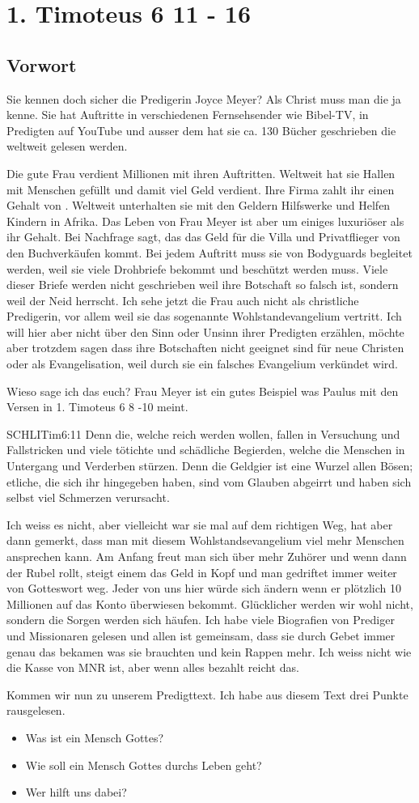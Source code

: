 \section{1. Timoteus 6 11 - 16}

\subsection{Vorwort}
Sie kennen doch sicher die Predigerin Joyce Meyer? Als Christ muss man die ja kenne. Sie hat Auftritte in verschiedenen Fernsehsender wie Bibel-TV, in Predigten auf YouTube und ausser dem hat sie ca. 130 Bücher geschrieben die weltweit gelesen werden.

Die gute Frau verdient Millionen mit ihren Auftritten. Weltweit hat sie Hallen mit Menschen gefüllt und damit viel Geld verdient. Ihre Firma zahlt ihr einen Gehalt von . Weltweit unterhalten sie mit den Geldern Hilfswerke und Helfen Kindern in Afrika. Das Leben von Frau Meyer ist aber um einiges luxuriöser als ihr Gehalt. Bei Nachfrage sagt, das das Geld für die Villa und Privatflieger von den Buchverkäufen kommt. Bei jedem Auftritt muss sie von Bodyguards begleitet werden, weil sie viele Drohbriefe bekommt und beschützt werden muss. Viele dieser Briefe werden nicht geschrieben weil ihre Botschaft so falsch ist, sondern weil der Neid herrscht. Ich sehe jetzt die Frau auch nicht als christliche Predigerin, vor allem weil sie das sogenannte Wohlstandevangelium vertritt. Ich will hier aber nicht über den Sinn oder Unsinn ihrer Predigten erzählen, möchte aber trotzdem sagen dass ihre Botschaften nicht geeignet sind für neue Christen oder als Evangelisation, weil durch sie ein falsches Evangelium verkündet wird.

Wieso sage ich das euch? Frau Meyer ist ein gutes Beispiel was Paulus mit den Versen in 1. Timoteus 6 8 -10 meint.
\begin{bibelbox}{SCHL}{ITim}{6:11}
Denn die, welche reich werden wollen, fallen in Versuchung und Fallstricken und viele tötichte und schädliche Begierden, welche die Menschen in Untergang und Verderben stürzen. Denn die Geldgier ist eine Wurzel allen Bösen; etliche, die sich ihr hingegeben haben, sind vom Glauben abgeirrt und haben sich selbst viel Schmerzen verursacht.
\end{bibelbox}
Ich weiss es nicht, aber vielleicht war sie mal auf dem richtigen Weg, hat aber dann gemerkt, dass man mit diesem Wohlstandsevangelium viel mehr Menschen ansprechen kann. Am Anfang freut man sich über mehr Zuhörer und wenn dann der Rubel rollt, steigt einem das Geld in Kopf und man gedriftet immer weiter von Gotteswort weg. Jeder von uns hier würde sich ändern wenn er plötzlich 10 Millionen auf das Konto überwiesen bekommt. Glücklicher werden wir wohl nicht, sondern die Sorgen werden sich häufen. Ich habe viele Biografien von Prediger und Missionaren gelesen und allen ist gemeinsam, dass sie durch Gebet immer genau das bekamen was sie brauchten und kein Rappen mehr. Ich weiss nicht wie die Kasse von MNR ist, aber wenn alles bezahlt reicht das.

Kommen wir nun zu unserem Predigttext. Ich habe aus diesem Text drei Punkte rausgelesen.
\begin{itemize}
    \item Was ist ein Mensch Gottes?
    \item Wie soll ein Mensch Gottes durchs Leben geht?
    \item Wer hilft uns dabei?
\end{itemize}
